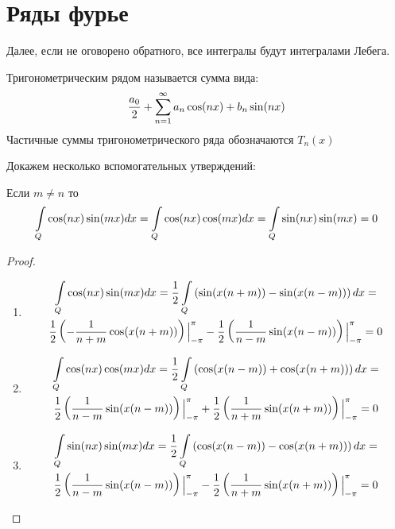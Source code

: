 \section{Ряды фурье}


Далее, если не оговорено обратного, все интегралы будут интегралами Лебега.
\begin{definition}
	Тригонометрическим рядом называется сумма вида:
	\begin{gather*}
		\frac{a_0}{2} + \sum\limits_{n = 1}^{\infty} a_n \cos(nx) + b_n \sin(nx)
	\end{gather*}
	Частичные суммы тригонометрического ряда обозначаются $T_n(x)$
\end{definition}

Докажем несколько вспомогательных утверждений:
\begin{statement}
	Если $m \neq  n$ то
\begin{gather*}
	\int\limits_{Q}\cos(nx)\sin(mx)dx = \int\limits_{Q}\cos(nx)\cos(mx)dx = \int\limits_{Q}\sin(nx)\sin(mx) = 0
\end{gather*}
\end{statement}
	
\begin{proof}
	\begin{enumerate}
		\item 
			\begin{gather*}
				\int\limits_{Q}\cos(nx)\sin(mx)dx = 
				\frac{1}{2}\int\limits_{Q}\left( \sin(x(n + m)) - \sin(x(n - m))\right) dx =\\
				\frac{1}{2}\left( -\frac{1}{n + m}\cos(x(n + m))\right)\Big|_{-\pi}^{\pi} -
				\frac{1}{2}\left( \frac{1}{n - m}\sin(x(n - m))\right)\Big|_{-\pi}^{\pi} = 0
			\end{gather*}
		\item
			\begin{gather*}
				\int\limits_{Q}\cos(nx)\cos(mx)dx = 
				\frac{1}{2}\int\limits_{Q}\left( \cos(x(n - m)) + \cos(x(n + m))\right) dx =\\
				\frac{1}{2}\left( \frac{1}{n - m}\sin(x(n - m))\right)\Big|_{-\pi}^{\pi} +
				\frac{1}{2}\left( \frac{1}{n + m}\sin(x(n + m))\right)\Big|_{-\pi}^{\pi} = 0
			\end{gather*}
		\item
			\begin{gather*}
				\int\limits_{Q}\sin(nx)\sin(mx)dx = 
				\frac{1}{2}\int\limits_{Q}\left( \cos(x(n - m)) - \cos(x(n + m))\right) dx =\\
				\frac{1}{2}\left( \frac{1}{n - m}\sin(x(n - m))\right)\Big|_{-\pi}^{\pi} -
				\frac{1}{2}\left( \frac{1}{n + m}\sin(x(n + m))\right)\Big|_{-\pi}^{\pi} = 0
			\end{gather*}		
	\end{enumerate}
\end{proof}

